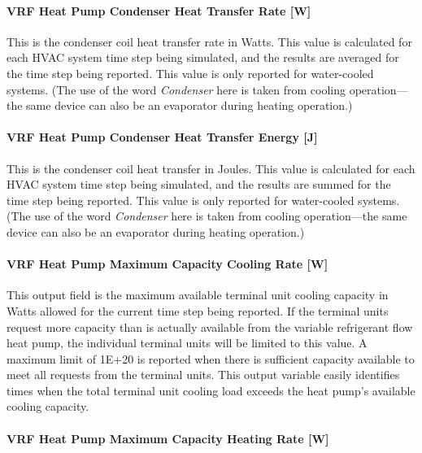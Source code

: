 \paragraph{VRF Heat Pump Condenser Heat Transfer Rate {[}W{]}}\label{vrf-heat-pump-condenser-heat-transfer-rate-w}

This is the condenser coil heat transfer rate in Watts. This value is calculated for each HVAC system time step being simulated, and the results are averaged for the time step being reported. This value is only reported for water-cooled systems. (The use of the word \emph{Condenser} here is taken from cooling operation---the same device can also be an evaporator during heating operation.)

\paragraph{VRF Heat Pump Condenser Heat Transfer Energy {[}J{]}}\label{vrf-heat-pump-condenser-heat-transfer-energy-j}

This is the condenser coil heat transfer in Joules. This value is calculated for each HVAC system time step being simulated, and the results are summed for the time step being reported. This value is only reported for water-cooled systems. (The use of the word \emph{Condenser} here is taken from cooling operation---the same device can also be an evaporator during heating operation.)

\paragraph{VRF Heat Pump Maximum Capacity Cooling Rate {[}W{]}}\label{vrf-heat-pump-maximum-capacity-cooling-rate-w}

This output field is the maximum available terminal unit cooling capacity in Watts allowed for the current time step being reported. If the terminal units request more capacity than is actually available from the variable refrigerant flow heat pump, the individual terminal units will be limited to this value. A maximum limit of 1E+20 is reported when there is sufficient capacity available to meet all requests from the terminal units. This output variable easily identifies times when the total terminal unit cooling load exceeds the heat pump's available cooling capacity.

\paragraph{VRF Heat Pump Maximum Capacity Heating Rate {[}W{]}}\label{vrf-heat-pump-maximum-capacity-heating-rate-w}

